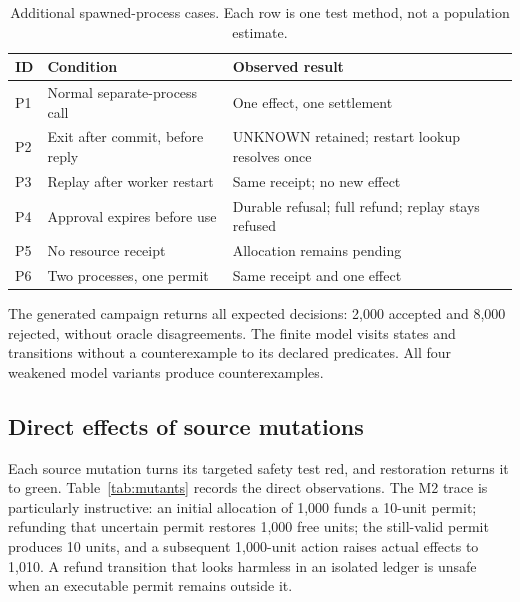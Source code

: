 \documentclass[10pt,journal,a4paper]{IEEEtran}
\begin{document}
\begin{table}[t]
\caption{Additional spawned-process cases. Each row is one test method, not a population estimate.}
\label{tab:process}
\centering\small
\begin{tabularx}{\columnwidth}{@{}l X X@{}}
\toprule
ID & Condition & Observed result\\
\midrule
P1 & Normal separate-process call & One effect, one settlement\\
P2 & Exit after commit, before reply & UNKNOWN retained; restart lookup resolves once\\
P3 & Replay after worker restart & Same receipt; no new effect\\
P4 & Approval expires before use & Durable refusal; full refund; replay stays refused\\
P5 & No resource receipt & Allocation remains pending\\
P6 & Two processes, one permit & Same receipt and one effect\\
\bottomrule
\end{tabularx}
\end{table}

The generated campaign returns all \CaseCount{} expected decisions: 2,000 accepted and 8,000 rejected, without oracle disagreements. The finite model visits \StateCount{} states and \TransitionCount{} transitions without a counterexample to its declared predicates. All four weakened model variants produce counterexamples.

\subsection{Direct effects of source mutations}
Each source mutation turns its targeted safety test red, and restoration returns it to green. Table~\ref{tab:mutants} records the direct observations. The M2 trace is particularly instructive: an initial allocation of 1,000 funds a 10-unit permit; refunding that uncertain permit restores 1,000 free units; the still-valid permit produces 10 units, and a subsequent 1,000-unit action raises actual effects to 1,010. A refund transition that looks harmless in an isolated ledger is unsafe when an executable permit remains outside it.
\end{document}
